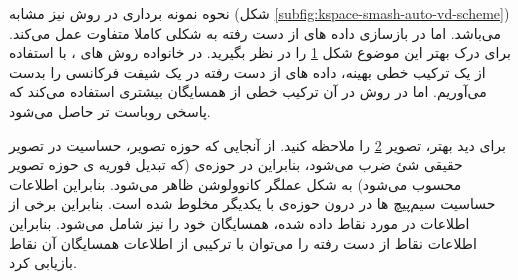 \begin{figure}
	\centering
	\removevspace[1]
	\caption{}
	\label{fig:kspace-smash-grappa}
\end{figure}

 نحوه نمونه برداری در روش 
نیز مشابه 
(شکل \ref{subfig:kspace-smash-auto-vd-scheme})
می‌باشد. اما در بازسازی داده های از دست رفته به شکلی کاملا متفاوت عمل می‌کند. برای درک بهتر این موضوع شکل \ref{fig:kspace-smash-grappa}
را در نظر بگیرید. در خانواده روش های 
، با استفاده از یک ترکیب خطی بهینه، داده های از دست رفته در یک شیفت فرکانسی را بدست می‌آوریم. اما در روش 
در آن ترکیب خطی از همسایگان بیشتری استفاده می‌کند که پاسخی روباست تر حاصل می‌شود.

\begin{figure}[t!]
	\centering
	\removevspace[1]
	\caption{}
	\label{fig:grappa-image-kspace}
\end{figure}

برای دید بهتر، تصویر \ref{fig:grappa-image-kspace}
را ملاحظه کنید. از آنجایی که حوزه تصویر، حساسیت در تصویر حقیقی شئ ضرب می‌شود، بنابراین در حوزه‌ی \kspace (که تبدیل فوریه ی حوزه تصویر محسوب می‌شود)
به شکل عملگر کانوولوشن ظاهر می‌شود. بنابراین اطلاعات حساسیت سیم‌پیچ ها در درون حوزه‌ی \kspace با یکدیگر مخلوط شده است.
بنابراین برخی از اطلاعات در مورد نقاط \kspace داده شده، همسایگان خود را نیز شامل می‌شود. بنابراین اطلاعات نقاط از دست رفته را می‌توان با ترکیبی از اطلاعات همسایگان آن نقاط بازیابی کرد.

